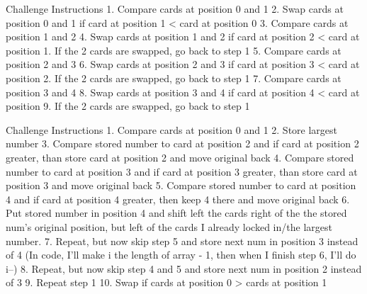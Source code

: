 Challenge Instructions
1. Compare cards at position 0 and 1
2. Swap cards at position 0 and 1 if card at position 1 < card at position 0
3. Compare cards at position 1 and 2
4. Swap cards at position 1 and 2 if card at position 2 < card at position 1. If the 2 cards are swapped, go back to step 1
5. Compare cards at position 2 and 3
6. Swap cards at position 2 and 3 if card at position 3 < card at position 2. If the 2 cards are swapped, go back to step 1
7. Compare cards at position 3 and 4
8. Swap cards at position 3 and 4 if card at position 4 < card at position 9. If the 2 cards are swapped, go back to step 1

Challenge Instructions
1. Compare cards at position 0 and 1
2. Store largest number
3. Compare stored number to card at position 2 and if card at position 2 greater, than store card at position 2 and move original back
4. Compare stored number to card at position 3 and if card at position 3 greater, than store card at position 3 and move original back
5. Compare stored number to card at position 4 and if card at position 4 greater, then keep 4 there and move original back
6. Put stored number in position 4 and shift left the cards right of the the stored num's original position, but left of the cards I already locked in/the largest number.
7. Repeat, but now skip step 5 and store next num in position 3 instead of 4 (In code, I'll make i the length of array - 1, then when I finish step 6, I'll do i--)
8. Repeat, but now skip step 4 and 5 and store next num in position 2 instead of 3
9. Repeat step 1
10. Swap if cards at position 0 > cards at position 1
